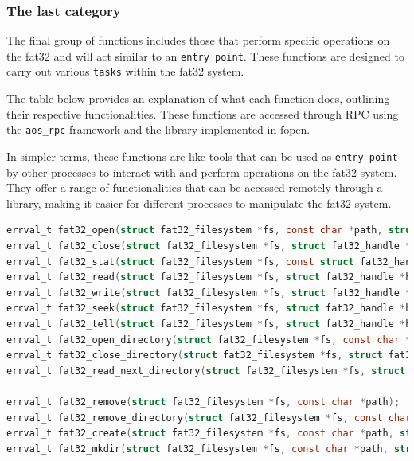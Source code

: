 \subsubsection{The last category}

The final group of functions includes those that perform specific operations on the fat32 and will act similar to an \texttt{entry point}. These functions are designed to carry out various \texttt{tasks} within the fat32 system.

The table below provides an explanation of what each function does, outlining their respective functionalities. These functions are accessed through RPC using the \texttt{aos\_rpc} framework and the library implemented in fopen.

In simpler terms, these functions are like tools that can be used as \texttt{entry point} by other processes to interact with and perform operations on the fat32 system. They offer a range of functionalities that can be accessed remotely through a library, making it easier for different processes to manipulate the fat32 system.

\begin{lstlisting}[caption={"Entry points" in the filesystem},captionpos=b,language=C,frame=single,breaklines]
errval_t fat32_open(struct fat32_filesystem *fs, const char *path, struct fat32_handle **handle);
errval_t fat32_close(struct fat32_filesystem *fs, struct fat32_handle *handle);
errval_t fat32_stat(struct fat32_filesystem *fs, const struct fat32_handle *handle, struct fs_fileinfo *info);
errval_t fat32_read(struct fat32_filesystem *fs, struct fat32_handle *handle, void *data, size_t size, size_t *nb_bytes_read);
errval_t fat32_write(struct fat32_filesystem *fs, struct fat32_handle *handle, const void *data, size_t size, size_t *nb_bytes_written);
errval_t fat32_seek(struct fat32_filesystem *fs, struct fat32_handle *handle,enum fs_seekpos whence,off_t offset);
errval_t fat32_tell(struct fat32_filesystem *fs, struct fat32_handle *handle, size_t *pos);
errval_t fat32_open_directory(struct fat32_filesystem *fs, const char *path, struct fat32_handle **handle);
errval_t fat32_close_directory(struct fat32_filesystem *fs, struct fat32_handle *handle);
errval_t fat32_read_next_directory(struct fat32_filesystem *fs, struct fat32_handle *handle, char **new_name);

errval_t fat32_remove(struct fat32_filesystem *fs, const char *path);
errval_t fat32_remove_directory(struct fat32_filesystem *fs, const char *path);
errval_t fat32_create(struct fat32_filesystem *fs, const char *path, struct fat32_handle **handle);
errval_t fat32_mkdir(struct fat32_filesystem *fs, const char *path, struct fat32_handle **handle);
\end{lstlisting}

